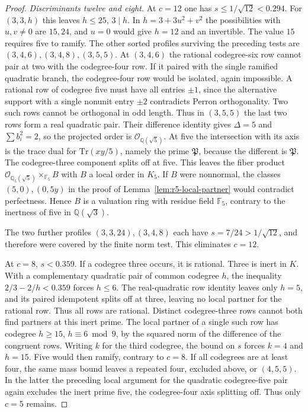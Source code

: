 \documentclass[11pt,a4paper]{article}
\numberwithin{equation}{section}
\begin{document}
\begin{proof}
\par\smallskip\noindent\emph{Discriminants twelve and eight.}\enspace
At $c=12$ one has $s\le1/\sqrt{12}<0.294$.
For $(3,3,h)$ this leaves $h\le25$, $3\mid h$. In
$h=3+3u^2+v^2$ the possibilities with $u,v\ne0$ are $15,24$,
and $u=0$ would give $h=12$ and an invertible. The value $15$
requires five to ramify. The other sorted profiles surviving the
preceding tests are $(3,4,6),(3,4,8),(3,5,5)$.
At $(3,4,6)$ the rational codegree-six row cannot pair at two
with the codegree-four row. If it paired with the single ramified
quadratic branch, the codegree-four row would be isolated, again
impossible. A rational row of codegree five must have all entries
$\pm1$, since the alternative support with a single nonunit entry
$\pm2$ contradicts Perron orthogonality. Two such rows cannot be
orthogonal in odd length. Thus in $(3,5,5)$ the last two rows form
a real quadratic pair. Their difference identity gives
$\Delta=5$ and $\sum b_i^2=2$, so the projected order is
$\mathcal O_{\mathbb Q(\sqrt5)}$. At five the intersection with
its axis is the trace dual for $\mathrm{Tr}(xy/5)$, namely the
prime $\mathfrak P$, because the different is $\mathfrak P$. The
codegree-three component splits off at five. This leaves the fiber
product $\mathcal O_{\mathbb Q_5(\sqrt5)}\times_{\mathbb F_5}B$
with $B$ a local order in $K_5$. If $B$ were nonnormal, the
classes $(5,0),(0,5y)$ in the proof of
Lemma~\ref{lem:r5-local-partner} would contradict perfectness.
Hence $B$ is a valuation ring with residue field $\mathbb F_5$,
contrary to the inertness of five in $\mathbb Q(\sqrt3)$.

The two further profiles $(3,3,24),(3,4,8)$ each have
$s=7/24>1/\sqrt{12}$, and therefore were covered by the finite
norm test. This eliminates $c=12$.

At $c=8$, $s<0.359$. If a codegree three occurs, it is rational.
Three is inert in $K$. With a complementary quadratic pair of common
codegree $h$, the inequality $2/3-2/h<0.359$ forces $h\le6$.
The real-quadratic row identity leaves only $h=5$, and its paired
idempotent splits off at three, leaving no local partner for the
rational row. Thus all rows are rational. Distinct codegree-three
rows cannot both find partners at this inert prime. The local partner
of a single such row has codegree $h\ge15$, $h\equiv6\bmod9$,
by the squared norm of the difference of the congruent rows.
Writing $k$ for the third codegree, the bound on $s$ forces $k=4$
and $h=15$. Five would then ramify, contrary to $c=8$.
If all codegrees are at least four, the same mass bound leaves a
repeated four, excluded above, or $(4,5,5)$. In the latter the
preceding local argument for the quadratic codegree-five pair again
excludes the inert prime five, the codegree-four axis splitting off.
Thus only $c=5$ remains.
\end{proof}
\end{document}
